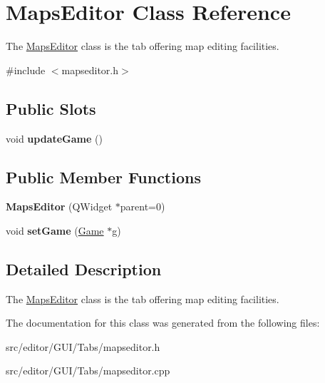 \hypertarget{class_maps_editor}{\section{\-Maps\-Editor \-Class \-Reference}
\label{class_maps_editor}
}


\-The \hyperlink{class_maps_editor}{\-Maps\-Editor} class is the tab offering map editing facilities.  




{\ttfamily \#include $<$mapseditor.\-h$>$}

\subsection*{\-Public \-Slots}
\begin{DoxyCompactItemize}
\item 
\hypertarget{class_maps_editor_a8bed7de9beb523be5c9568927def310f}{void {\bfseries update\-Game} ()}\label{class_maps_editor_a8bed7de9beb523be5c9568927def310f}

\end{DoxyCompactItemize}
\subsection*{\-Public \-Member \-Functions}
\begin{DoxyCompactItemize}
\item 
\hypertarget{class_maps_editor_aff2b57188162ccabbad0583e585bd622}{{\bfseries \-Maps\-Editor} (\-Q\-Widget $\ast$parent=0)}\label{class_maps_editor_aff2b57188162ccabbad0583e585bd622}

\item 
\hypertarget{class_maps_editor_acdb6e263aff6bea6e0f089da3e6e4a3e}{void {\bfseries set\-Game} (\hyperlink{class_game}{\-Game} $\ast$g)}\label{class_maps_editor_acdb6e263aff6bea6e0f089da3e6e4a3e}

\end{DoxyCompactItemize}


\subsection{\-Detailed \-Description}
\-The \hyperlink{class_maps_editor}{\-Maps\-Editor} class is the tab offering map editing facilities. 

\-The documentation for this class was generated from the following files\-:\begin{DoxyCompactItemize}
\item 
src/editor/\-G\-U\-I/\-Tabs/mapseditor.\-h\item 
src/editor/\-G\-U\-I/\-Tabs/mapseditor.\-cpp\end{DoxyCompactItemize}
